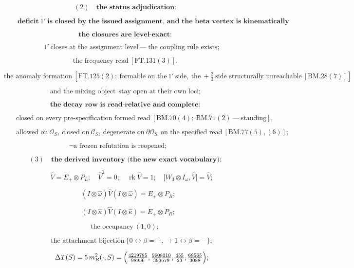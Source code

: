 \documentclass[11pt,openany]{report}
\theoremstyle{canonplain}
\theoremstyle{canondef}
\begin{document}
\[
(2)\quad\textbf{the status adjudication:}
\]

\[
\qquad \boxed{\ \textbf{deficit}\ 1'\ \textbf{is closed by the issued assignment, and the beta vertex is kinematically allowed on the specified read's exact opening region}\ }
\]

\[
\textbf{the closures are level-exact:}
\]

\[
\qquad 1'\ \text{closes at the assignment level}\ —\ \text{the coupling rule exists};
\]

\[
\ \text{the frequency read}\ [\mathrm{FT.131}(3)],
\]

\[
\ \text{the anomaly formation}\ [\mathrm{FT.125}(2):\ \text{formable on the}\ 1'\ \text{side},\ \text{the}\ +\tfrac23\ \text{side structurally unreachable}\ [\mathrm{BM.28}(7)]],
\]

\[
\ \text{and the mixing object}\ \ \text{stay open at their own loci};
\]

\[
\textbf{the decay row is read-relative and complete:}
\]

\[
\qquad \text{closed on every pre-specification formed read}\ [\mathrm{BM.70}(4);\ \mathrm{BM.71}(2)\ —\ \text{standing}],
\]

\[
\qquad \text{allowed on}\ \mathcal O_S,\ \text{closed on}\ \mathcal C_S,\ \text{degenerate on}\ \partial\mathcal O_S\ \ \text{on the specified read}\ [\mathrm{BM.77}(5),(6)];
\]

\[
\neg\text{a frozen refutation is reopened};\qquad
\]

\[
(3)\quad\textbf{the derived inventory (the new exact vocabulary):}
\]

\[
\qquad \widehat V=E_+\otimes P_L;\quad\widehat V^2=0;\quad\operatorname{rk}\widehat V=1;\quad\bigl[W_3\otimes I_\omega,\widehat V\bigr]=\widehat V;
\]

\[
\quad (I\otimes\hat\omega)\widehat V(I\otimes\hat\omega)=E_+\otimes P_R;
\]

\[
\quad (I\otimes\hat\kappa)\widehat V(I\otimes\hat\kappa)=E_+\otimes P_R;
\]

\[
\text{the occupancy}\ (1,0);
\]

\[
\qquad \text{the attachment bijection}\ \{0\leftrightarrow\beta{=}{+},\ {+}1\leftrightarrow\beta{=}{-}\};
\]

\[
\qquad \Delta T(S)=5\,m^2_B(\cdot,S)=\Bigl(\tfrac{4219785}{98956},\tfrac{9608310}{393679},\tfrac{455}{23},\tfrac{68565}{3088}\Bigr);
\]
\end{document}
